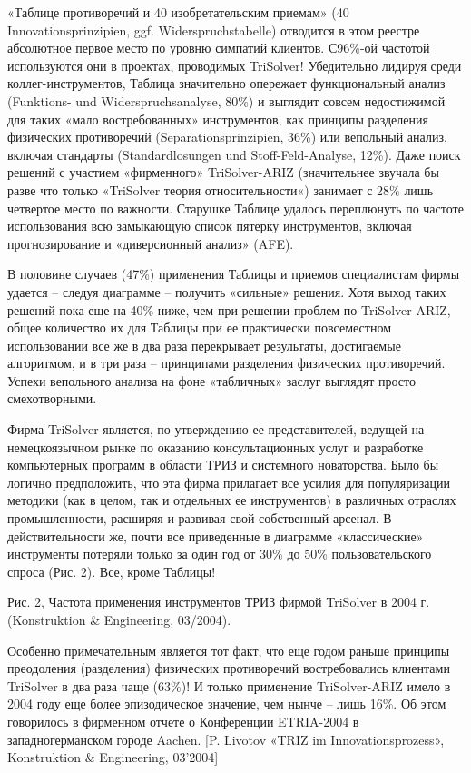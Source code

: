 \documentclass[11pt,a4paper]{article}
\begin{document}
«Таблице противоречий и 40 изобретательским приемам» (40
Innovationsprinzipien, ggf. Widerspruchstabelle) отводится в этом реестре
абсолютное первое место по уровню симпатий клиентов. С96\%-ой частотой
используются они в проектах, проводимых TriSolver! Убедительно лидируя среди
коллег-инструментов, Таблица значительно опережает функциональный анализ
(Funktions- und Widerspruchsanalyse, 80\%) и выглядит совсем недостижимой для
таких «мало востребованных» инструментов, как принципы разделения физических
противоречий (Separationsprinzipien, 36\%) или вепольный анализ, включая
стандарты (Standardlosungen und Stoff-Feld-Analyse, 12\%). Даже поиск решений
с участием «фирменного» TriSolver-ARIZ (значительнее звучала бы разве что
только «TriSolver теория относительности«) занимает с 28\% лишь четвертое
место по важности. Старушке Таблице удалось переплюнуть по частоте
использования всю замыкающую список пятерку инструментов, включая
прогнозирование и «диверсионный анализ» (AFE).

В половине случаев (47\%) применения Таблицы и приемов специалистам фирмы
удается -- следуя диаграмме -- получить «сильные» решения. Хотя выход таких
решений пока еще на 40\% ниже, чем при решении проблем по TriSolver-ARIZ,
общее количество их для Таблицы при ее практически повсеместном использовании
все же в два раза перекрывает результаты, достигаемые алгоритмом, и в три раза
-- принципами разделения физических противоречий. Успехи вепольного анализа на
фоне «табличных» заслуг выглядят просто смехотворными.

Фирма TriSolver является, по утверждению ее представителей, ведущей на
немецкоязычном рынке по оказанию консультационных услуг и разработке
компьютерных программ в области ТРИЗ и системного новаторства. Было бы логично
предположить, что эта фирма прилагает все усилия для популяризации методики
(как в целом, так и отдельных ее инструментов) в различных отраслях
промышленности, расширяя и развивая свой собственный арсенал. В
действительности же, почти все приведенные в диаграмме «классические»
инструменты потеряли только за один год от 30\% до 50\% пользовательского
спроса (Рис. 2). Все, кроме Таблицы!

Рис. 2, Частота применения инструментов ТРИЗ фирмой TriSolver в 2004
г. (Konstruktion \& Engineering, 03/2004).

Особенно примечательным является тот факт, что еще годом раньше принципы
преодоления (разделения) физических противоречий востребовались клиентами
TriSolver в два раза чаще (63\%)! И только применение TriSolver-ARIZ имело в
2004 году еще более эпизодическое значение, чем нынче -- лишь 16\%. Об этом
говорилось в фирменном отчете о Конференции ETRIA-2004 в западногерманском
городе Aachen. [P. Livotov «TRIZ im Innovationsprozess», Konstruktion \&
  Engineering, 03'2004]
\end{document}
